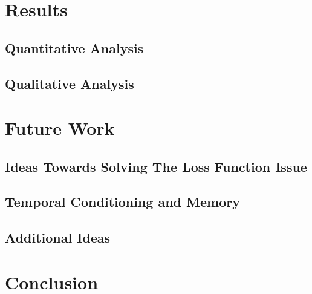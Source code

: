 \documentclass[12pt]{article}
\begin{document}
\newpage\section{Results} \label{sec:results}
\subsection{Quantitative Analysis} \label{ssec:51}
\subsection{Qualitative Analysis} \label{ssec:52}

\newpage\section{Future Work} \label{sec:future}
\subsection{Ideas Towards Solving The Loss Function Issue} \label{ssec:61}
\subsection{Temporal Conditioning and Memory} \label{ssec:62}
\subsection{Additional Ideas} \label{ssec:63}

\newpage\section{Conclusion} \label{sec:conclusion}



\newpage
\end{document}
